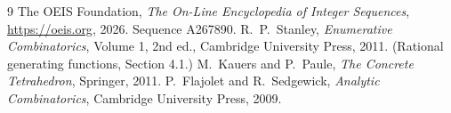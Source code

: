 \documentclass[11pt,a4paper]{article}
\theoremstyle{plain}
\theoremstyle{definition}
\begin{document}
\begin{thebibliography}{9}
 The OEIS Foundation, \emph{The On-Line Encyclopedia of Integer
Sequences}, \url{https://oeis.org}, 2026. Sequence A267890.
 R.~P.~Stanley, \emph{Enumerative Combinatorics}, Volume 1, 2nd ed.,
Cambridge University Press, 2011. (Rational generating functions, Section 4.1.)
 M.~Kauers and P.~Paule, \emph{The Concrete Tetrahedron}, Springer, 2011.
 P.~Flajolet and R.~Sedgewick, \emph{Analytic Combinatorics}, Cambridge
University Press, 2009.
\end{thebibliography}
\end{document}

